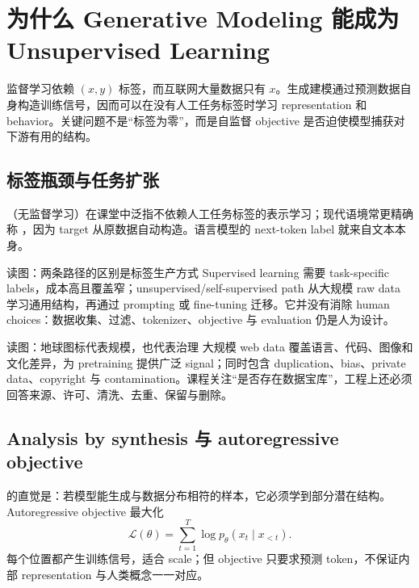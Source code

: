 \section{为什么 Generative Modeling 能成为 Unsupervised Learning}

监督学习依赖 $(x,y)$ 标签，而互联网大量数据只有 $x$。生成建模通过预测数据自身构造训练信号，因而可以在没有人工任务标签时学习 representation 和 behavior。关键问题不是“标签为零”，而是自监督 objective 是否迫使模型捕获对下游有用的结构。

\subsection{标签瓶颈与任务扩张}

（无监督学习）在课堂中泛指不依赖人工任务标签的表示学习；现代语境常更精确称 ，因为 target 从原数据自动构造。语言模型的 next-token label 就来自文本本身。


\begin{knowledgebox}{读图：两条路径的区别是标签生产方式}
Supervised learning 需要 task-specific labels，成本高且覆盖窄；unsupervised/self-supervised path 从大规模 raw data 学习通用结构，再通过 prompting 或 fine-tuning 迁移。它并没有消除 human choices：数据收集、过滤、tokenizer、objective 与 evaluation 仍是人为设计。
\end{knowledgebox}


\begin{knowledgebox}{读图：地球图标代表规模，也代表治理}
大规模 web data 覆盖语言、代码、图像和文化差异，为 pretraining 提供广泛 signal；同时包含 duplication、bias、private data、copyright 与 contamination。课程关注“是否存在数据宝库”，工程上还必须回答来源、许可、清洗、去重、保留与删除。
\end{knowledgebox}

\subsection{Analysis by synthesis 与 autoregressive objective}

 的直觉是：若模型能生成与数据分布相符的样本，它必须学到部分潜在结构。Autoregressive objective 最大化
\[
\mathcal{L}(\theta)=\sum_{t=1}^{T}\log p_\theta(x_t\mid x_{<t}).
\]
每个位置都产生训练信号，适合 scale；但 objective 只要求预测 token，不保证内部 representation 与人类概念一一对应。

